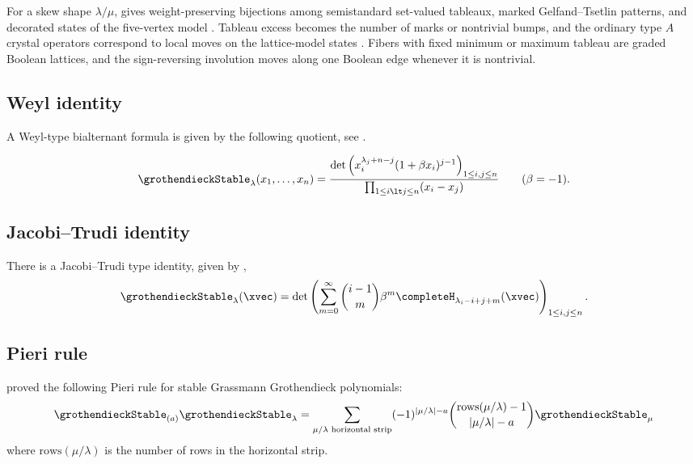 For a skew shape $\lambda/\mu$,  gives
weight-preserving bijections among semistandard set-valued tableaux, marked
Gelfand--Tsetlin patterns, and decorated states of the five-vertex model
\cite[Thms.~4.6 and~5.11]{Shimazaki2026Crystals}.  Tableau excess becomes the
number of marks or nontrivial bumps, and the ordinary type $A$ crystal
operators correspond to local moves on the lattice-model states
\cite[Thm.~6.9]{Shimazaki2026Crystals}.  Fibers with fixed minimum or maximum
tableau are graded Boolean lattices, and the sign-reversing involution moves
along one Boolean edge whenever it is nontrivial.


\subsection[grothendieckStableWeyl]{Weyl identity}

A Weyl-type bialternant formula is given by the following quotient,
see \cite{IkedaNaruse2013,Kirillov2016,Iwao2019}.

\begin{align}
\grothendieckStable_\lambda(x_1,\dotsc,x_n) =
\frac{ \det \left( x_i^{\lambda_j+n-j}(1+\beta x_i)^{j-1} \right)_{1\leq i,j \leq n} }{
\prod_{1 \leq i \lt j \leq n} (x_i - x_j)
} \qquad (\beta = -1).
\end{align}


\subsection[grothendieckStableJacobiTrudi]{Jacobi--Trudi identity}

There is a Jacobi--Trudi type identity, given by \cite[Thm.~1.10]{Kirillov2016},
\begin{align}
\grothendieckStable_\lambda(\xvec) =
\det\left(
\sum_{m=0}^\infty \binom{i-1}{m} \beta^m \completeH_{\lambda_i-i+j+m}(\xvec)
\right)_{1\leq i,j \leq n}.
\end{align}


\subsection[grothendieckStablePieri]{Pieri rule}

 \cite{Lenart2000} proved the following Pieri rule for stable
Grassmann Grothendieck polynomials:
\[
\grothendieckStable_{(a)}\grothendieckStable_{\lambda} =
\sum_{\mu / \lambda \text{ horizontal strip}}
(-1)^{|\mu/\lambda|-a} \binom{ \textrm{rows}(\mu/\lambda)-1 }{ |\mu/\lambda|-a } \grothendieckStable_{\mu}
\]
where $\textrm{rows}(\mu/\lambda)$ is the number of rows in the horizontal strip.



